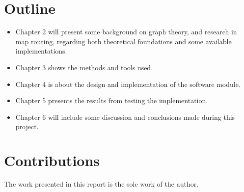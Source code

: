 \documentclass[../main.tex]{subfiles}
\begin{document}
\section{Outline}
\begin{itemize}
\item  Chapter 2 will present some background on graph theory, and research in map routing, regarding both theoretical foundations and some available implementations.

\item Chapter 3 shows the methods and tools used.

\item Chapter 4 is about the design and implementation of the software module.

\item Chapter 5 presents the results from testing the implementation.

\item Chapter 6 will include some discussion and conclusions made during this project.
\end{itemize}

\section{Contributions}
The work presented in this report is the sole work of the author.
\end{document}
